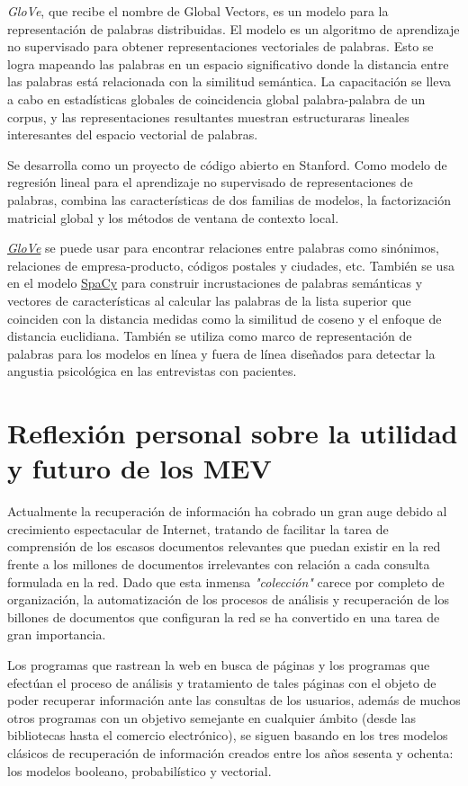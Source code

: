 \documentclass[titlepage]{article}
\begin{document}
\textit{GloVe}, que recibe el nombre de Global Vectors, es un modelo para la representación de palabras distribuidas. El modelo es un algoritmo de aprendizaje no supervisado para obtener representaciones vectoriales de palabras. Esto se logra mapeando las palabras en un espacio significativo donde la distancia entre las palabras está relacionada con la similitud semántica. La capacitación se lleva a cabo en estadísticas globales de coincidencia global palabra-palabra de un corpus, y las representaciones resultantes muestran estructuraras lineales interesantes del espacio vectorial de palabras. 

Se desarrolla como un proyecto de código abierto en Stanford.  Como modelo de regresión lineal para el aprendizaje no supervisado de representaciones de palabras, combina las características de dos familias de modelos, la factorización matricial global y los métodos de ventana de contexto local.

\href{https://www.aclweb.org/anthology/D14-1162/}{\textit{GloVe}} se puede usar para encontrar relaciones entre palabras como sinónimos, relaciones de empresa-producto, códigos postales y ciudades, etc. También se usa en el modelo \href{https://spacy.io/}{SpaCy} para construir incrustaciones de palabras semánticas y vectores de características al calcular las palabras de la lista superior que coinciden con la distancia medidas como la similitud de coseno y el enfoque de distancia euclidiana. También se utiliza como marco de representación de palabras para los modelos en línea y fuera de línea diseñados para detectar la angustia psicológica en las entrevistas con pacientes. 

\section{Reflexión personal sobre la utilidad y futuro de los MEV}

Actualmente la recuperación de información ha cobrado un gran auge debido al crecimiento espectacular de Internet, tratando de facilitar la tarea de comprensión de los escasos documentos relevantes que puedan existir en la red frente a los millones de documentos irrelevantes con relación a cada consulta formulada en la red. Dado que esta inmensa \textit{"colección"} carece por completo de organización, la automatización de los procesos de análisis y recuperación de los billones de documentos que configuran la red se ha convertido en una tarea de gran importancia.

Los programas que rastrean la web en busca de páginas y los programas que efectúan el proceso de análisis y tratamiento de tales páginas con el objeto de poder recuperar información ante las consultas de los usuarios, además de muchos otros programas con un objetivo semejante en cualquier ámbito (desde las bibliotecas hasta el comercio electrónico), se siguen basando en los tres modelos clásicos de recuperación de información creados entre los años sesenta y ochenta: los modelos booleano, probabilístico y vectorial. 
\end{document}
